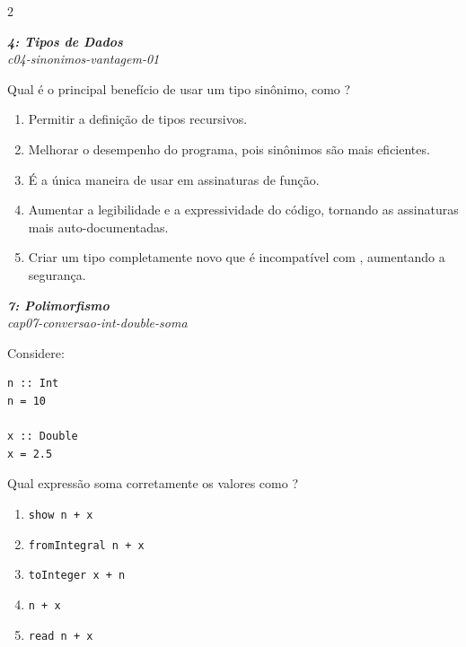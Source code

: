 \documentclass[a4paper,10pt,brazil]{article}
\begin{document}
\begin{multicols}{2}
\begin{flushright}
  \footnotesize
  \textit{\textbf{4: Tipos de Dados}}\\
  \textit{c04-sinonimos-vantagem-01}\\

\end{flushright}
Qual é o principal benefício de usar um tipo sinônimo, como ?

\begin{enumerate}
  \item Permitir a definição de tipos recursivos.

  \item Melhorar o desempenho do programa, pois sinônimos são mais eficientes.

  \item É a única maneira de usar  em assinaturas de função.

  \item Aumentar a legibilidade e a expressividade do código, tornando as assinaturas mais auto-documentadas.

  \item Criar um tipo completamente novo que é incompatível com , aumentando a segurança.


\end{enumerate}

\begin{flushright}
  \footnotesize
  \textit{\textbf{7: Polimorfismo}}\\
  \textit{cap07-conversao-int-double-soma}\\

\end{flushright}
Considere:

\begin{verbatim}
n :: Int
n = 10

x :: Double
x = 2.5
\end{verbatim}

Qual expressão soma corretamente os valores como ?

\begin{enumerate}
  \item \texttt{show n + x}
  \item \texttt{fromIntegral n + x}
  \item \texttt{toInteger x + n}
  \item \texttt{n + x}
  \item \texttt{read n + x}


\end{enumerate}
\end{multicols}
\end{document}
